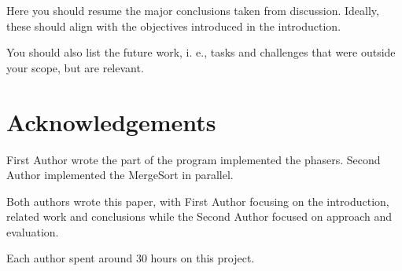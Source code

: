 \documentclass[runningheads]{llncs}
\begin{document}
Here you should resume the major conclusions taken from discussion. Ideally, these should align with the objectives introduced in the introduction.


You should also list the future work, i. e., tasks and challenges that were outside your scope, but are relevant.

\section*{Acknowledgements}

First Author wrote the part of the program implemented the phasers. Second Author implemented the MergeSort in parallel. 

Both authors wrote this paper, with First Author focusing on the introduction, related work and conclusions while the Second Author focused on approach and evaluation.

Each author spent around 30 hours on this project.



\end{document}
